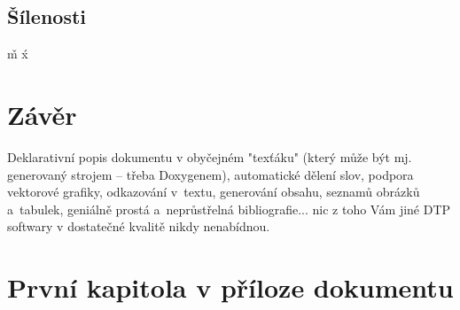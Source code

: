 \documentclass[12pt, a4paper]{report}
\begin{document}
\section{Šílenosti}
\v{m} \'{x}

\chapter{Závěr}
Deklarativní popis dokumentu v obyčejném "texťáku" (který může být mj. generovaný strojem -- třeba Doxygenem),
automatické dělení slov, podpora vektorové grafiky, odkazování v~textu, generování obsahu, seznamů obrázků a~tabulek,
geniálně prostá a~neprůstřelná bibliografie... nic z toho Vám jiné DTP softwary v dostatečné kvalitě nikdy nenabídnou.





\listoffigures
\listoftables

\appendix
\chapter{První kapitola v příloze dokumentu}
\end{document}
